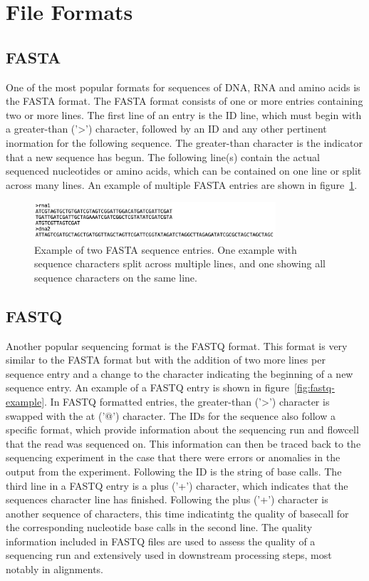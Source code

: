 \section{File Formats}

\subsection{FASTA}
One of the most popular formats for sequences of DNA, RNA and amino
acids is the FASTA format. The FASTA format consists of one or more
entries containing two or more lines. The first line of an entry is
the ID line, which must begin with a greater-than ('>') character,
followed by an ID and any other pertinent inormation for the following
sequence. The greater-than character is the indicator that a new
sequence has begun. The following line(s) contain the actual sequenced
nucleotides or amino acids, which can be contained on one line or
split across many lines. An example of multiple FASTA entries are
shown in figure~\ref{fig:fasta-example}.

\begin{figure}
  \centering
  \includegraphics[width=0.8\textwidth]{figures/fasta-example.png}
  \caption{Example of two FASTA sequence entries. One example with
    sequence characters split across multiple lines, and one showing
    all sequence characters on the same line.}
  \label{fig:fasta-example}
\end{figure}

\subsection{FASTQ}
Another popular sequencing format is the FASTQ format. This format is
very similar to the FASTA format but with the addition of two more
lines per sequence entry and a change to the character indicating the
beginning of a new sequence entry. An example of a FASTQ entry is
shown in figure~\ref{fig:fastq-example}. In FASTQ formatted entries,
the greater-than ('>') character is swapped with the at ('@')
character. The IDs for the sequence also follow a specific format,
which provide information about the sequencing run and flowcell that
the read was sequenced on. This information can then be traced back to
the sequencing experiment in the case that there were errors or
anomalies in the output from the experiment. Following the ID is the
string of base calls. The third line in a FASTQ entry is a plus ('+')
character, which indicates that the sequences character line has
finished. Following the plus ('+') character is another sequence of
characters, this time indicatintg the quality of basecall for the
corresponding nucleotide base calls in the second line. The quality
information included in FASTQ files are used to assess the quality of
a sequencing run and extensively used in downstream processing steps,
most notably in alignments.

